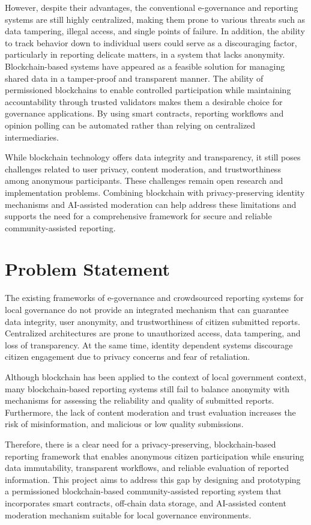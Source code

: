 However, despite their advantages, the conventional e-governance and reporting systems are still highly centralized, making them prone to various threats such as data tampering, illegal access, and single points of failure. In addition, the ability to track behavior down to individual users could serve as a discouraging factor, particularly in reporting delicate matters, in a system that lacks anonymity. Blockchain-based systems have appeared as a feasible solution for managing shared data in a tamper-proof and transparent manner. The ability of permissioned blockchains to enable controlled participation while maintaining accountability through trusted validators makes them a desirable choice for governance applications. By using smart contracts, reporting workflows and opinion polling can be automated rather than relying on centralized intermediaries. 

While blockchain technology offers data integrity and transparency, it still poses challenges related to user privacy, content moderation, and trustworthiness among anonymous participants.  These challenges remain open research and implementation problems. Combining  blockchain with privacy-preserving identity mechanisms and \ac{AI}-assisted moderation can help address these limitations and supports the need for a comprehensive framework for secure and reliable community-assisted reporting.

\section{Problem Statement}

The existing frameworks of e-governance and crowdsourced reporting systems for local governance do not provide an integrated mechanism that can guarantee data integrity, user anonymity, and trustworthiness of citizen submitted reports. Centralized architectures are prone to unauthorized access, data tampering, and loss of transparency. At the same time, identity dependent systems discourage citizen engagement due to privacy concerns and fear of retaliation.

Although blockchain has been applied to the context of local government context, many blockchain-based reporting systems still fail to balance anonymity with mechanisms for assessing the reliability and quality of submitted reports. Furthermore, the lack of content moderation and trust evaluation increases the risk of misinformation, and malicious or low quality submissions. 

Therefore, there is a clear need for a privacy-preserving, blockchain-based reporting framework that enables anonymous citizen participation while ensuring data immutability, transparent workflows, and reliable evaluation of reported information. This project aims to address this gap by designing and prototyping a permissioned blockchain-based community-assisted reporting system that incorporates smart contracts, off-chain data storage, and \ac{AI}-assisted content moderation mechanism suitable for local governance environments.



